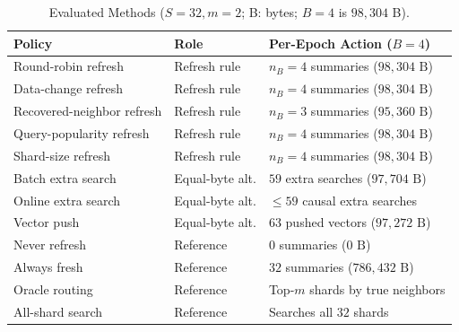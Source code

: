 \begin{table}[!t]
\centering
\caption{Evaluated Methods ($S{=}32, m{=}2$; B: bytes; $B{=}4$ is $98{,}304$ B).}
\label{tab:methods}
\scriptsize
\renewcommand{\arraystretch}{0.68}
\setlength{\tabcolsep}{3.5pt}
\begin{tabular}{@{}lll@{}}
\toprule
\textbf{Policy} & \textbf{Role} & \textbf{Per-Epoch Action ($B{=}4$)} \\
\midrule
Round-robin refresh & Refresh rule & $n_B{=}4$ summaries ($98,304\text{ B}$) \\
Data-change refresh & Refresh rule & $n_B{=}4$ summaries ($98,304\text{ B}$) \\
Recovered-neighbor refresh & Refresh rule & $n_B{=}3$ summaries ($95,360\text{ B}$) \\
Query-popularity refresh & Refresh rule & $n_B{=}4$ summaries ($98,304\text{ B}$) \\
Shard-size refresh & Refresh rule & $n_B{=}4$ summaries ($98,304\text{ B}$) \\
Batch extra search & Equal-byte alt. & $59$ extra searches ($97,704\text{ B}$) \\
Online extra search & Equal-byte alt. & $\le 59$ causal extra searches \\
Vector push & Equal-byte alt. & $63$ pushed vectors ($97,272\text{ B}$) \\
Never refresh & Reference & $0$ summaries ($0\text{ B}$) \\
Always fresh & Reference & $32$ summaries ($786,432\text{ B}$) \\
Oracle routing & Reference & Top-$m$ shards by true neighbors \\
All-shard search & Reference & Searches all $32$ shards \\
\bottomrule
\end{tabular}
\end{table}

